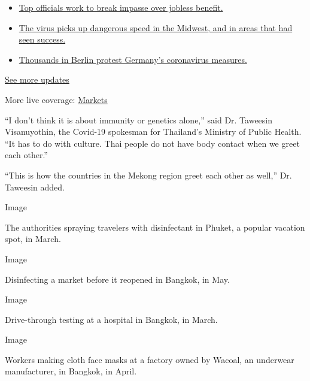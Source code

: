 \begin{itemize}
\tightlist
\item
  \href{https://www.nytimes3xbfgragh.onion/2020/08/01/world/coronavirus-covid-19.html?action=click\&pgtype=Article\&state=default\&region=MAIN_CONTENT_1\&context=storylines_live_updates\#link-3ac56579}{Top
  officials work to break impasse over jobless benefit.}
\item
  \href{https://www.nytimes3xbfgragh.onion/2020/08/01/world/coronavirus-covid-19.html?action=click\&pgtype=Article\&state=default\&region=MAIN_CONTENT_1\&context=storylines_live_updates\#link-8796723}{The
  virus picks up dangerous speed in the Midwest, and in areas that had
  seen success.}
\item
  \href{https://www.nytimes3xbfgragh.onion/2020/08/01/world/coronavirus-covid-19.html?action=click\&pgtype=Article\&state=default\&region=MAIN_CONTENT_1\&context=storylines_live_updates\#link-25930521}{Thousands
  in Berlin protest Germany's coronavirus measures.}
\end{itemize}

\href{https://www.nytimes3xbfgragh.onion/2020/08/01/world/coronavirus-covid-19.html?action=click\&pgtype=Article\&state=default\&region=MAIN_CONTENT_1\&context=storylines_live_updates}{See
more updates}

More live coverage:
\href{https://www.nytimes3xbfgragh.onion/live/2020/07/31/business/stock-market-today-coronavirus?action=click\&pgtype=Article\&state=default\&region=MAIN_CONTENT_1\&context=storylines_live_updates}{Markets}

``I don't think it is about immunity or genetics alone,'' said Dr.
Taweesin Visanuyothin, the Covid-19 spokesman for Thailand's Ministry of
Public Health. ``It has to do with culture. Thai people do not have body
contact when we greet each other.''

``This is how the countries in the Mekong region greet each other as
well,'' Dr. Taweesin added.

Image

The authorities spraying travelers with disinfectant in Phuket, a
popular vacation spot, in March.

Image

Disinfecting a market before it reopened in Bangkok, in May.

Image

Drive-through testing at a hospital in Bangkok, in March.

Image

Workers making cloth face masks at a factory owned by Wacoal, an
underwear manufacturer, in Bangkok, in April.

